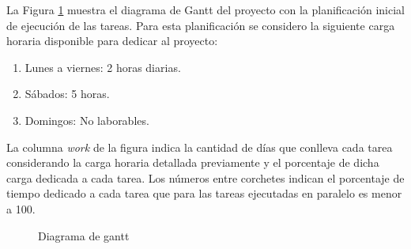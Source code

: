 \documentclass[11pt]{charter}
\begin{document}
La Figura \ref{fig:DiagGantt} muestra el diagrama de Gantt del proyecto con la planificación inicial de ejecución de las tareas. Para esta planificación se considero la siguiente carga horaria disponible para dedicar al proyecto:
\begin{enumerate}
	\item Lunes a viernes: 2 horas diarias. 
	\item Sábados: 5 horas.
	\item Domingos: No laborables.
\end{enumerate}	
La columna \textit{work} de la figura indica la cantidad de días que conlleva cada tarea considerando la carga horaria detallada previamente y el porcentaje de dicha carga dedicada a cada tarea. Los números entre corchetes indican el porcentaje de tiempo dedicado a cada tarea que para las tareas ejecutadas en paralelo es menor a 100.
\begin{figure}[htpb]
\centering 
{}
\caption{Diagrama de gantt}
\label{fig:DiagGantt}
\end{figure}
\end{document}
